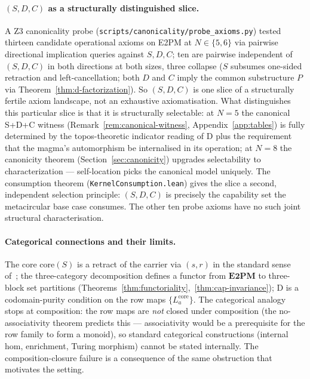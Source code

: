 \documentclass[sigconf,screen]{acmart}
\newcommand{\core}{\mathrm{core}}
\theoremstyle{remark}
\begin{document}
\paragraph{$(S, D, C)$ as a structurally distinguished slice.}
A Z3 canonicality probe (\texttt{scripts/canonicality/probe\_axioms.py}) tested thirteen candidate operational axioms on E2PM at $N \in \{5, 6\}$ via pairwise directional implication queries against $S, D, C$; ten are pairwise independent of $(S, D, C)$ in both directions at both sizes, three collapse ($S$ subsumes one-sided retraction and left-cancellation; both $D$ and $C$ imply the common substructure $P$ via Theorem~\ref{thm:d-factorization}). So $(S, D, C)$ is one slice of a structurally fertile axiom landscape, not an exhaustive axiomatisation. What distinguishes this particular slice is that it is structurally selectable: at $N\!=\!5$ the canonical S+D+C witness (Remark~\ref{rem:canonical-witness}, Appendix~\ref{app:tables}) is fully determined by the topos-theoretic indicator reading of D plus the requirement that the magma's automorphism be internalised in its operation; at $N\!=\!8$ the canonicity theorem (Section~\ref{sec:canonicity}) upgrades selectability to characterization --- self-location picks the canonical model uniquely. The consumption theorem (\texttt{KernelConsumption.lean}) gives the slice a second, independent selection principle: $(S, D, C)$ is precisely the capability set the metacircular base case consumes. The other ten probe axioms have no such joint structural characterisation.

\paragraph{Categorical connections and their limits.}
The core $\core(S)$ is a retract of the carrier via $(s, r)$ in the standard sense of~\cite{maclane71}; the three-category decomposition defines a functor from $\mathbf{E2PM}$ to three-block set partitions (Theorems~\ref{thm:functoriality},~\ref{thm:cap-invariance}); D is a codomain-purity condition on the row maps $\{L_a^{\core}\}$. The categorical analogy stops at composition: the row maps are \emph{not} closed under composition (the no-associativity theorem predicts this — associativity would be a prerequisite for the row family to form a monoid), so standard categorical constructions (internal hom, enrichment, Turing morphism) cannot be stated internally. The composition-closure failure is a consequence of the same obstruction that motivates the setting.
\end{document}
